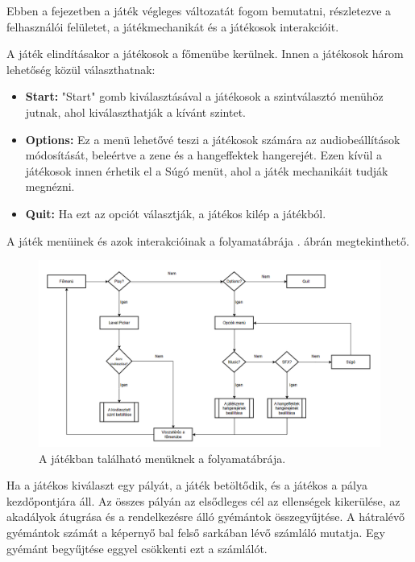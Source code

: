 
Ebben a fejezetben a játék végleges változatát fogom bemutatni, részletezve a felhasználói felületet, a játékmechanikát és a játékosok interakcióit.

A játék elindításakor a játékosok a főmenübe kerülnek. Innen a játékosok három lehetőség közül választhatnak:
\begin{itemize}
\item \textbf{Start:} "Start" gomb kiválasztásával a játékosok a szintválasztó menühöz jutnak, ahol kiválaszthatják a kívánt szintet.
\item \textbf{Options:} Ez a menü lehetővé teszi a játékosok számára az audiobeállítások módosítását, beleértve a zene és a hangeffektek hangerejét. Ezen kívül a játékosok innen érhetik el a Súgó menüt, ahol a játék mechanikáit tudják megnézni.
\item \textbf{Quit:} Ha ezt az opciót választják, a játékos kilép a játékból.
\end{itemize}

A játék menüinek és azok interakcióinak a folyamatábrája . ábrán megtekinthető.

\begin{figure}[ht]
\centering
\includegraphics[width=\textwidth]{images/menuflowchart.png}
\caption{A játékban található menüknek a folyamatábrája.}
\label{fig:menuflowchart}
\end{figure}

Ha a játékos kiválaszt egy pályát, a játék betöltődik, és a játékos a pálya kezdőpontjára áll. Az összes pályán az elsődleges cél az ellenségek kikerülése, az akadályok átugrása és a rendelkezésre álló gyémántok összegyűjtése. A hátralévő gyémántok számát a képernyő bal felső sarkában lévő számláló mutatja. Egy gyémánt begyűjtése eggyel csökkenti ezt a számlálót.

